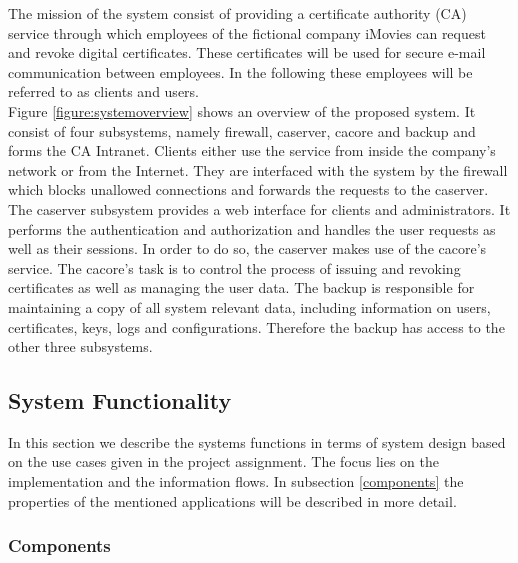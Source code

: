\documentclass[english]{article}
\begin{document}
The mission of the system consist of providing a certificate authority (CA) service through which employees of the fictional company iMovies can request and revoke digital certificates. These certificates will be used for secure e-mail communication between employees. In the following these employees will be referred to as clients and users.\\
Figure {\ref{figure:systemoverview}} shows an overview of the proposed system. It consist of four subsystems, namely firewall, caserver, cacore and backup and forms the CA Intranet. Clients either use the service from inside the company's network or from the Internet. They are interfaced with the system by the firewall which blocks unallowed connections and forwards the requests to the caserver. The caserver subsystem provides a web interface for clients and administrators. It performs the authentication and authorization and handles the user requests as well as their sessions. In order to do so, the caserver makes use of the cacore's service. The cacore's task is to control the process of issuing and revoking certificates as well as managing the user data. The backup is responsible for maintaining a copy of all system relevant data, including information on users, certificates, keys, logs and configurations. Therefore the backup has access to the other three subsystems.



\subsection{System Functionality} 
 In this section we describe the systems functions in terms of system design based on the use cases given in the project assignment. The focus lies on the implementation and the information flows. In subsection \ref{components} the properties of the mentioned applications will be described in more detail.
 
 \subsubsection{Components}\label{compfunc}
\end{document}
